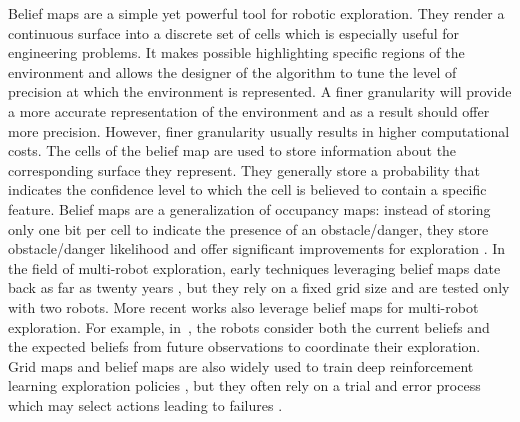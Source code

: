 Belief maps are a simple yet powerful tool for robotic exploration.
They render a continuous surface into a discrete set of cells which is especially useful for engineering problems. It makes possible highlighting specific regions of the environment and allows the designer of the algorithm to tune the level of precision at which the environment is represented. A finer granularity will provide a more accurate representation of the environment and as a result should offer more precision. However, finer granularity usually results in higher computational costs. The cells of the belief map are used to store information about the corresponding surface they represent. They generally store a probability that indicates the confidence level to which the cell is believed to contain a specific feature. Belief maps are a generalization of occupancy maps: instead of storing only one
bit per cell to indicate the presence of an obstacle/danger, they
store obstacle/danger likelihood and offer significant improvements
for exploration \cite{stachnissMappingExplorationMobile2003}. In the
field of multi-robot exploration, early techniques leveraging belief
maps date back as far as twenty years
\cite{kobayashiSharingExploringInformation2002,kobayashiDeterminationExplorationTarget2003},
but they rely on a fixed grid size and are tested only with two
robots. More recent works also leverage belief maps for multi-robot
exploration. For example,
in~\cite{indelmanCooperativeMultirobotBelief2018}, the robots consider
both the current beliefs and the expected beliefs from future
observations to coordinate their exploration. Grid maps and belief
maps are also widely used to train deep reinforcement learning
exploration policies
\cite{hanGridWiseControlMultiAgent,panovGridPathPlanning2018}, but they often rely on a trial and error process which may select actions leading to failures \cite{garciaSafeExplorationState2012,andersenSafeReinforcementlearningIndustrial2020}.


